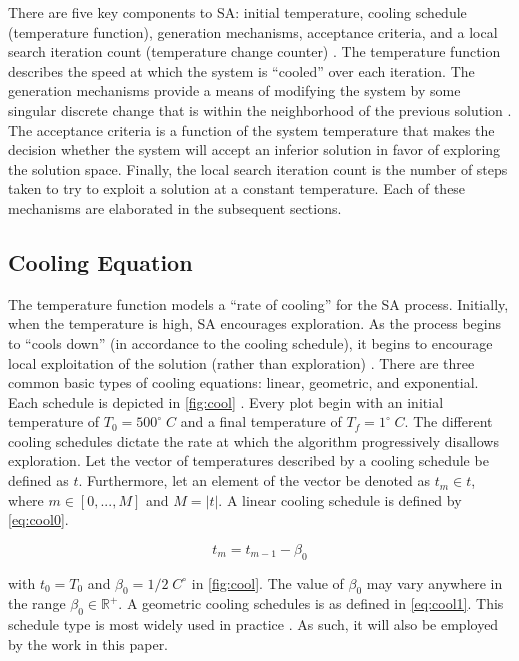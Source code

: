 \documentclass[11pt,a4paper,final]{article}
\newcommand{\Tau}{T}                        %
\begin{document}
There are five key components to SA: initial temperature, cooling schedule (temperature function), generation
mechanisms, acceptance criteria, and a local search iteration count (temperature change counter)
\cite{keller-2019-multi-objec,press-1992-numer-recip}. The temperature function describes the speed at which the
system is ``cooled'' over each iteration. The generation mechanisms provide a means of modifying the system by some
singular discrete change that is within the neighborhood of the previous solution \cite{gendreau-2018-handb-metah}. The
acceptance criteria is a function of the system temperature that makes the decision whether the system will accept an
inferior solution in favor of exploring the solution space. Finally, the local search iteration count is the number of
steps taken to try to exploit a solution at a constant temperature. Each of these mechanisms are elaborated in the
subsequent sections.

\subsection{Cooling Equation}
\label{cooling-equation-experimental}
The temperature function models a ``rate of cooling'' for the SA process. Initially, when the temperature is high, SA
encourages exploration. As the process begins to ``cools down'' (in accordance to the cooling schedule), it begins to
encourage local exploitation of the solution (rather than exploration)
\cite{rutenbar-1989-simul-anneal-algor,henderson-1989-theor-pract}. There are three common basic types of cooling
equations: linear, geometric, and exponential. Each schedule is depicted in \ref{fig:cool} \cite{keller-2019-multi-objec}.
Every plot begin with an initial temperature of \(T_0 = 500^\circ\; C\) and a final temperature of \(T_f = 1^\circ\; C\). The
different cooling schedules dictate the rate at which the algorithm progressively disallows exploration. Let the vector
of temperatures described by a cooling schedule be defined as \(t\). Furthermore, let an element of the vector be denoted
as \(t_m \in t\), where \(m \in [0,...,M]\) and \(M = \lvert t \rvert\). A linear cooling schedule is defined by \ref{eq:cool0}.

\begin{equation}
\label{eq:cool0}
t_m = t_{m-1} - \beta_0
\end{equation}

with \(t_0 = \Tau_0\) and \(\beta_0 = 1/2\; C^\circ\) in \ref{fig:cool}. The value of \(\beta_0\) may vary anywhere in the range \(\beta_0 \in \mathbb{R}^+\). A
geometric cooling schedules is as defined in \ref{eq:cool1}. This schedule type is most widely used in practice
\cite{keller-2019-multi-objec}. As such, it will also be employed by the work in this paper.
\end{document}
